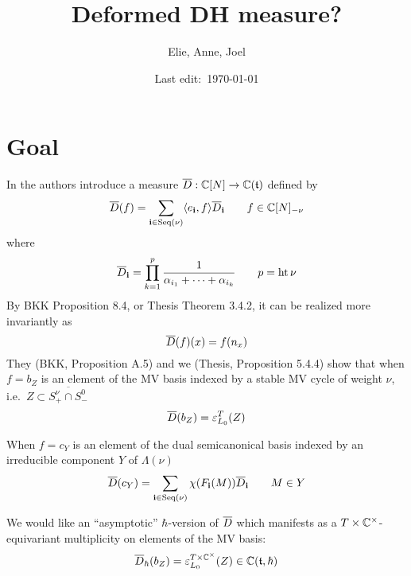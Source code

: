 \documentclass[11pt]{article}
\title{Deformed DH measure?}
\author{Elie, Anne, Joel}
\date{Last edit:~\today}
\begin{document}
% 
\maketitle
% 
\section{Goal}
In \cite{baumann2019mirkovic} the authors introduce a measure $\overline{D}:\mathbb C[N]\to\mathbb C(\mathfrak t)$ defined by 
\begin{equation}
    \label{eq:defbard}
    \overline{D}(f) = \sum_{\mathbf{i}\in\operatorname{Seq}(\nu)}\langle e_{\mathbf{i}},f\rangle\overline{D}_{\mathbf{i}}\qquad f \in \mathbb C[N]_{-\nu}
\end{equation}
where 
\begin{equation}
    \label{eq:bardi}
    \overline{D}_{\mathbf{i}} = \prod_{k=1}^p\frac{1}{\alpha_{i_1} + \cdots + \alpha_{i_k}} \qquad p = \operatorname{ht} \nu 
\end{equation}
By BKK Proposition 8.4, or Thesis Theorem 3.4.2, it can be realized more invariantly as 
\begin{equation}
    \label{eq:invbard}
     \overline{D}(f)(x) = f(n_x)
\end{equation}
They (BKK, Proposition A.5) and we (Thesis, Proposition 5.4.4) show that when $f = b_Z$ is an element of the MV basis indexed by a stable MV cycle of weight $\nu$, i.e.\ $Z\subset \overline{S^\nu_+\cap S^0_-}$
\begin{equation}
    \label{eq:bardaseqm}
    \overline{D}(b_Z) = \varepsilon_{L_0}^T (Z) 
\end{equation}

When $f = c_Y$ is an element of the dual semicanonical basis indexed by an irreducible component $Y$ of $\Lambda(\nu)$
\begin{equation}
    \label{eq:bardaseu} %
    \barD(c_Y) = \sum_{\vi\in\Seq(\nu)}\chi(F_{\vi}(M))\barD_{\vi} \qquad M \in Y
\end{equation}

We would like an ``asymptotic'' $\hbar$-version of $\overline{D}$ which manifests as a $T\times\mathbb C^\times$-equivariant multiplicity on elements of the MV basis:
$$
\overline{D}_\hbar(b_Z) = \varepsilon_{L_0}^{T\times\mathbb C^\times} (Z) \in \mathbb C(\mathfrak t,\hbar)
$$
\end{document}
